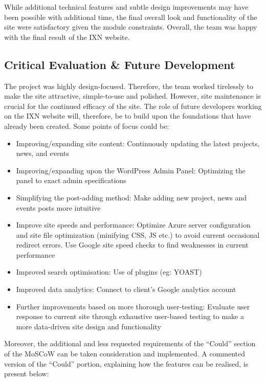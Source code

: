 \documentclass[fontsize=10pt]{extarticle}
\numberwithin{figure}{section} %
\providecommand{\tightlist}{%
  \setlength{\itemsep}{0pt}\setlength{\parskip}{0pt}}
\begin{document}
While additional technical features and subtle design improvements may
have been possible with additional time, the final overall look and
functionality of the site were satisfactory given the module
constraints. Overall, the team was happy with the final result of the
IXN website.

\hypertarget{critical-evaluation-future-development}{%
\subsection{Critical Evaluation \& Future
Development}\label{critical-evaluation-future-development}}

The project was highly design-focused. Therefore, the team worked
tirelessly to make the site attractive, simple-to-use and polished.
However, site maintenance is crucial for the continued efficacy of the
site.\cite{g8} The role of future developers working on the IXN website
will, therefore, be to build upon the foundations that have already been
created. Some points of focus could be:

\begin{itemize}
\tightlist
\item
  Improving/expanding site content: Continuously updating the latest
  projects, news, and events
\item
  Improving/expanding upon the WordPress Admin Panel: Optimizing the
  panel to exact admin specifications
\item
  Simplifying the post-adding method: Make adding new project, news and
  events posts more intuitive
\item
  Improve site speeds and performance: Optimize Azure server
  configuration and site file optimization (minifying CSS, JS etc.) to
  avoid current occasional redirect errors. Use Google site speed checks
  to find weaknesses in current performance
\item
  Improved search optimisation: Use of plugins (eg: YOAST)
\item
  Improved data analytics: Connect to client's Google analytics account
\item
  Further improvements based on more thorough user-testing: Evaluate
  user response to current site through exhaustive user-based testing to
  make a more data-driven site design and functionality
\end{itemize}

Moreover, the additional and less requested requirements of the
``Could'' section of the MoSCoW can be taken consideration and
implemented. A commented version of the ``Could'' portion, explaining
how the features can be realised, is present below:
\end{document}
